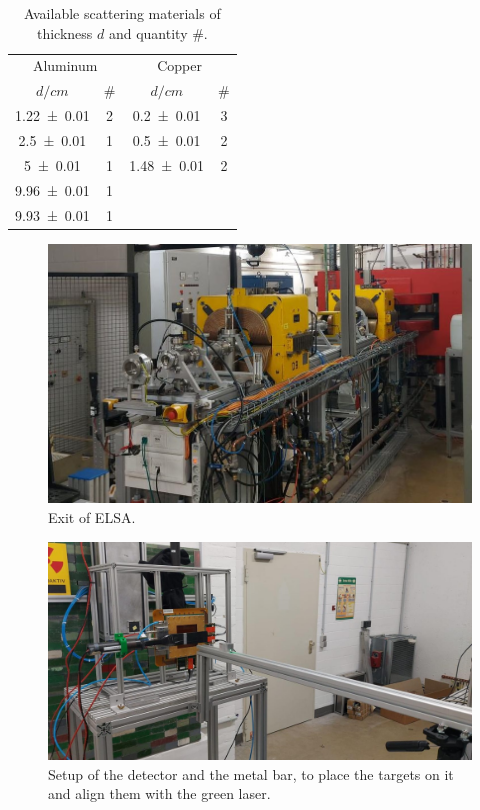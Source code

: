 \documentclass[sn-mathphys-num,iicol]{sn-jnl}
\theoremstyle{thmstyleone}
\theoremstyle{thmstyletwo}
\theoremstyle{thmstylethree}
\begin{document}
\begin{table}\centering
  \renewcommand*{\arraystretch}{1.1}
  \begin{tabular}{c|c||c|c}
    \multicolumn{2}{c||}{Aluminum} & \multicolumn{2}{c}{Copper} \\
    {\fontsize{8}{3}\selectfont $d/\si{cm}$} & {\fontsize{8}{3}\selectfont \#} & {\fontsize{8}{3}\selectfont $d/\si{cm}$} & {\fontsize{8}{3}\selectfont \# } \\\hline \rule{0pt}{3ex}
    \num{1.22\pm 0.01} & 2 & \num{0.2\pm 0.01} & 3 \\
    \num{2.5\pm 0.01} & 1 & \num{0.5\pm 0.01} & 2 \\
    \num{5\pm 0.01} & 1 & \num{1.48\pm 0.01} & 2 \\
    \num{9.96\pm 0.01} & 1 & & \\
    \num{9.93\pm 0.01} & 1 & & \\
  \end{tabular}\vspace{3mm}
  \caption{Available scattering materials of thickness $d$ and quantity $\#$.}
  \label{tab:available_materials}
\end{table}

\begin{figure}
  \includegraphics[width=\linewidth]{figures/beam_setup_elsa.jpg}
  \caption{Exit of ELSA.}
  \label{fig:beam_setup_elsa}
\end{figure}

\begin{figure}
  \includegraphics[width=\linewidth]{figures/detector_setup_elsa.jpg}
  \caption{Setup of the detector and the metal bar, to place the targets on it and align them with the green laser.}
  \label{fig:detector_setup_elsa}
\end{figure}
\end{document}
